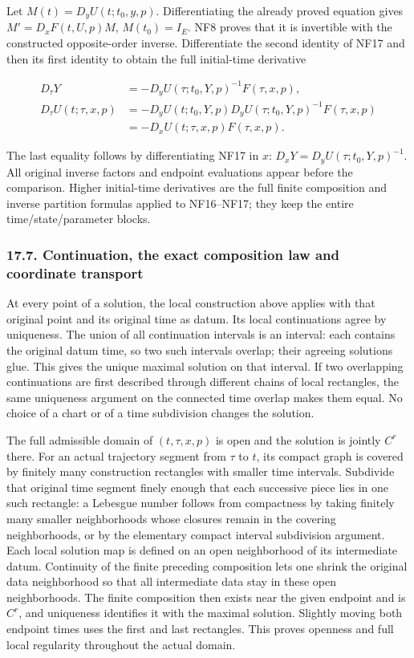 \documentclass[
  11pt,
]{article}
\begin{document}
Let \(M(t)=D_yU(t;t_0,y,p)\). Differentiating the already proved
equation gives \(M'=D_xF(t,U,p)M\), \(M(t_0)=I_E\). NF8 proves that it
is invertible with the constructed opposite-order inverse. Differentiate
the second identity of NF17 and then its first identity to obtain the
full initial-time derivative

\[
 \begin{aligned}
 D_\tau Y&=
  -D_yU(\tau;t_0,Y,p)^{-1}F(\tau,x,p),\\
 D_\tau U(t;\tau,x,p)&=
  -D_yU(t;t_0,Y,p)
   D_yU(\tau;t_0,Y,p)^{-1}F(\tau,x,p)\\
  &=-D_xU(t;\tau,x,p)F(\tau,x,p).
 \end{aligned}
 \tag{NF18}
\]

The last equality follows by differentiating NF17 in \(x\):
\(D_xY=D_yU(\tau;t_0,Y,p)^{-1}\). All original inverse factors and
endpoint evaluations appear before the comparison. Higher initial-time
derivatives are the full finite composition and inverse partition
formulas applied to NF16--NF17; they keep the entire
time/state/parameter blocks.

\subsubsection{17.7. Continuation, the exact composition law and
coordinate
transport}\label{continuation-the-exact-composition-law-and-coordinate-transport}

At every point of a solution, the local construction above applies with
that original point and its original time as datum. Its local
continuations agree by uniqueness. The union of all continuation
intervals is an interval: each contains the original datum time, so two
such intervals overlap; their agreeing solutions glue. This gives the
unique maximal solution on that interval. If two overlapping
continuations are first described through different chains of local
rectangles, the same uniqueness argument on the connected time overlap
makes them equal. No choice of a chart or of a time subdivision changes
the solution.

The full admissible domain of \((t,\tau,x,p)\) is open and the solution
is jointly \(C^r\) there. For an actual trajectory segment from \(\tau\)
to \(t\), its compact graph is covered by finitely many construction
rectangles with smaller time intervals. Subdivide that original time
segment finely enough that each successive piece lies in one such
rectangle: a Lebesgue number follows from compactness by taking finitely
many smaller neighborhoods whose closures remain in the covering
neighborhoods, or by the elementary compact interval subdivision
argument. Each local solution map is defined on an open neighborhood of
its intermediate datum. Continuity of the finite preceding composition
lets one shrink the original data neighborhood so that all intermediate
data stay in these open neighborhoods. The finite composition then
exists near the given endpoint and is \(C^r\), and uniqueness identifies
it with the maximal solution. Slightly moving both endpoint times uses
the first and last rectangles. This proves openness and full local
regularity throughout the actual domain.
\end{document}
